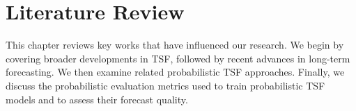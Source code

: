 \documentclass[a4paper,oneside,bibliography=totoc]{scrbook}
\begin{document}
\chapter{Literature Review}
\label{ch:related_work}
This chapter reviews key works that have influenced our research. We begin by covering broader developments in TSF, followed by recent advances in long-term forecasting. We then examine related probabilistic TSF approaches. Finally, we discuss the probabilistic evaluation metrics used to train probabilistic TSF models and to assess their forecast quality.



\end{document}
